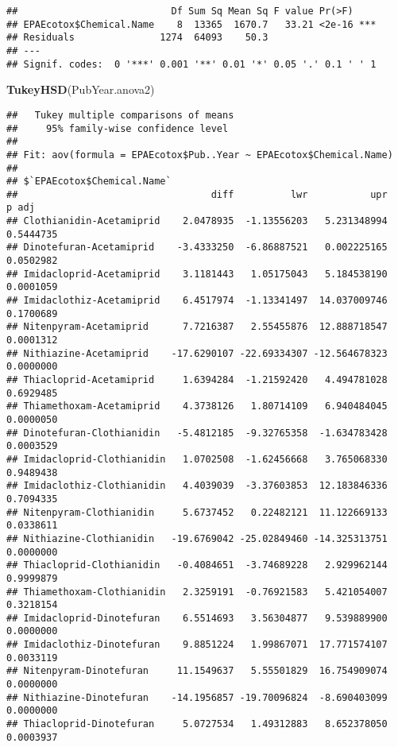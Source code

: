 \documentclass[]{article}
\newenvironment{Shaded}{\begin{snugshade}}{\end{snugshade}}
\newcommand{\KeywordTok}[1]{\textcolor[rgb]{0.13,0.29,0.53}{\textbf{#1}}}
\newcommand{\NormalTok}[1]{#1}
\begin{document}
\begin{verbatim}
##                           Df Sum Sq Mean Sq F value Pr(>F)    
## EPAEcotox$Chemical.Name    8  13365  1670.7   33.21 <2e-16 ***
## Residuals               1274  64093    50.3                   
## ---
## Signif. codes:  0 '***' 0.001 '**' 0.01 '*' 0.05 '.' 0.1 ' ' 1
\end{verbatim}

\begin{Shaded}
\begin{Highlighting}[]
\KeywordTok{TukeyHSD}\NormalTok{(PubYear.anova2)}
\end{Highlighting}
\end{Shaded}

\begin{verbatim}
##   Tukey multiple comparisons of means
##     95% family-wise confidence level
## 
## Fit: aov(formula = EPAEcotox$Pub..Year ~ EPAEcotox$Chemical.Name)
## 
## $`EPAEcotox$Chemical.Name`
##                                  diff          lwr           upr     p adj
## Clothianidin-Acetamiprid    2.0478935  -1.13556203   5.231348994 0.5444735
## Dinotefuran-Acetamiprid    -3.4333250  -6.86887521   0.002225165 0.0502982
## Imidacloprid-Acetamiprid    3.1181443   1.05175043   5.184538190 0.0001059
## Imidaclothiz-Acetamiprid    6.4517974  -1.13341497  14.037009746 0.1700689
## Nitenpyram-Acetamiprid      7.7216387   2.55455876  12.888718547 0.0001312
## Nithiazine-Acetamiprid    -17.6290107 -22.69334307 -12.564678323 0.0000000
## Thiacloprid-Acetamiprid     1.6394284  -1.21592420   4.494781028 0.6929485
## Thiamethoxam-Acetamiprid    4.3738126   1.80714109   6.940484045 0.0000050
## Dinotefuran-Clothianidin   -5.4812185  -9.32765358  -1.634783428 0.0003529
## Imidacloprid-Clothianidin   1.0702508  -1.62456668   3.765068330 0.9489438
## Imidaclothiz-Clothianidin   4.4039039  -3.37603853  12.183846336 0.7094335
## Nitenpyram-Clothianidin     5.6737452   0.22482121  11.122669133 0.0338611
## Nithiazine-Clothianidin   -19.6769042 -25.02849460 -14.325313751 0.0000000
## Thiacloprid-Clothianidin   -0.4084651  -3.74689228   2.929962144 0.9999879
## Thiamethoxam-Clothianidin   2.3259191  -0.76921583   5.421054007 0.3218154
## Imidacloprid-Dinotefuran    6.5514693   3.56304877   9.539889900 0.0000000
## Imidaclothiz-Dinotefuran    9.8851224   1.99867071  17.771574107 0.0033119
## Nitenpyram-Dinotefuran     11.1549637   5.55501829  16.754909074 0.0000000
## Nithiazine-Dinotefuran    -14.1956857 -19.70096824  -8.690403099 0.0000000
## Thiacloprid-Dinotefuran     5.0727534   1.49312883   8.652378050 0.0003937

\end{verbatim}
\end{document}
